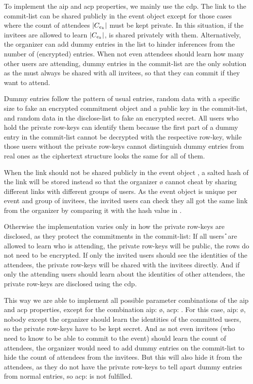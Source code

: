 To implement the \Ac{aip} and \Ac{acp} properties, we mainly use the \acl{cdp}.
%
The link to the commit-list \CLL{} can be shared publicly in the event object 
\eo{} except for those cases where the count of attendees $|\C{}|$ must be kept 
private. In this situation, if the invitees \I{} are allowed to learn $|\C{}|$, 
\CLL{} is shared privately with them. Alternatively, the organizer can add dummy entries 
in the list to hinder inferences from the number of (encrypted) entries. 
When not even attendees should learn how many other users are attending, 
dummy entries in the commit-list are the only solution as the \CLL{} must always 
be shared with all invitees, so that they can commit if they want to attend.

Dummy entries follow the pattern of usual entries, \ie random data with a specific 
size to fake an encrypted commitment object and a public key in the commit-list, and 
random data in the disclose-list to fake an encrypted secret. 
All users who hold the private row-keys can identify them 
because the first part of a dummy entry in the commit-list cannot be decrypted 
with the respective row-key, while those users without the private row-keys cannot distinguish 
dummy entries from real ones as the ciphertext structure looks the same for all 
of them. 

When the link \CLL{} should not be shared publicly in the event object \eo{}, a 
salted hash of the link will be stored instead so that the organizer 
\o{} cannot cheat by sharing different links with different groups of users. As the 
event object is unique per event and group of invitees, the invited
users can check they all got the same link %
from the organizer by comparing it with the hash value in \eo{}.

Otherwise the implementation varies only in how the private row-keys are disclosed, 
as they protect the commitments in the commit-list: If all users 
\U{} are allowed to learn who is attending, the private row-keys will be public, \ie 
the rows do not need to be encrypted. If only the invited users \I{} should see 
the identities of the attendees, the private row-keys will be shared with the invitees 
directly. And if only the attending users should learn about the identities 
of other attendees, the private row-keys are disclosed using the \acl{cdp}.

This way we are able to implement all possible parameter combinations of
the \Ac{aip} and \Ac{acp} properties, except for the combination
\Ac{aip}: \o{}, \Ac{acp}: \C{}. For this case, \ie \Ac{aip}: \o{}, 
nobody except the organizer should learn the identities of the
committed users, so the private row-keys have to be kept secret. And as
not even invitees (who need to know \CLL{} to be able to commit to
the event) should learn the count of attendees, the organizer
would need to add dummy entries on the commit-list to hide the count of
attendees from the invitees. But this will also hide it from the
attendees, as they do not have the private row-keys to tell apart dummy
entries from normal entries, so \Ac{acp}: \C{} is not fulfilled.

